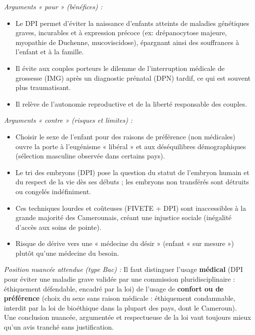 \documentclass[11pt]{article}
\newcommand{\cle}[1]{{\popxbold\color{popdark}#1}}
\begin{document}
\begin{corrige}
\emph{Arguments « pour » (bénéfices) :}
\begin{itemize}
\item Le DPI permet d'éviter la naissance d'enfants atteints de maladies génétiques graves, incurables et à expression précoce (ex: drépanocytose majeure, myopathie de Duchenne, mucoviscidose), épargnant ainsi des souffrances à l'enfant et à la famille.
\item Il évite aux couples porteurs le dilemme de l'interruption médicale de grossesse (IMG) après un diagnostic prénatal (DPN) tardif, ce qui est souvent plus traumatisant.
\item Il relève de l'autonomie reproductive et de la liberté responsable des couples.
\end{itemize}
\emph{Arguments « contre » (risques et limites) :}
\begin{itemize}
\item Choisir le sexe de l'enfant pour des raisons de préférence (non médicales) ouvre la porte à l'\cle{eugénisme} « libéral » et aux déséquilibres démographiques (sélection masculine observée dans certains pays).
\item Le tri des embryons (DPI) pose la question du statut de l'embryon humain et du respect de la vie dès ses débuts ; les embryons non transférés sont détruits ou congelés indéfiniment.
\item Ces techniques lourdes et coûteuses (FIVETE + DPI) sont inaccessibles à la grande majorité des Camerounais, créant une injustice sociale (inégalité d'accès aux soins de pointe).
\item Risque de dérive vers une « médecine du désir » (enfant « sur mesure ») plutôt qu'une médecine du besoin.
\end{itemize}
\emph{Position nuancée attendue (type Bac) :} Il faut distinguer l'usage \textbf{médical} (DPI pour éviter une maladie grave validée par une commission pluridisciplinaire : éthiquement défendable, encadré par la loi) de l'usage de \textbf{confort ou de préférence} (choix du sexe sans raison médicale : éthiquement condamnable, interdit par la loi de bioéthique dans la plupart des pays, dont le Cameroun). Une conclusion nuancée, argumentée et respectueuse de la loi vaut toujours mieux qu'un avis tranché sans justification.
\end{corrige}
\end{document}
